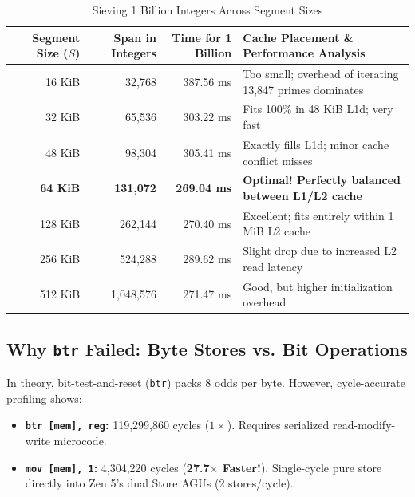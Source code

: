 \documentclass[11pt,a4paper]{article}
\begin{document}
\begin{table}[htbp]
\centering
\scriptsize
\caption{Sieving 1 Billion Integers Across Segment Sizes}
\label{tab:cache_bench}
\begin{tabular}{r r r l}
\toprule
\textbf{Segment Size ($S$)} & \textbf{Span in Integers} & \textbf{Time for 1 Billion} & \textbf{Cache Placement \& Performance Analysis} \\
\midrule
16 KiB & 32,768 & 387.56 ms & Too small; overhead of iterating 13,847 primes dominates \\
32 KiB & 65,536 & 303.22 ms & Fits 100\% in 48 KiB L1d; very fast \\
48 KiB & 98,304 & 305.41 ms & Exactly fills L1d; minor cache conflict misses \\
\textbf{64 KiB} & \textbf{131,072} & \textbf{269.04 ms} & \textbf{Optimal! Perfectly balanced between L1/L2 cache} \\
128 KiB & 262,144 & 270.40 ms & Excellent; fits entirely within 1 MiB L2 cache \\
256 KiB & 524,288 & 289.62 ms & Slight drop due to increased L2 read latency \\
512 KiB & 1,048,576 & 271.47 ms & Good, but higher initialization overhead \\
\bottomrule
\end{tabular}
\end{table}

\subsection{Why \texttt{btr} Failed: Byte Stores vs. Bit Operations}
In theory, bit-test-and-reset (\texttt{btr}) packs 8 odds per byte. However, cycle-accurate profiling shows:
\begin{itemize}\setlength{\itemsep}{0pt}
    \item \textbf{\texttt{btr [mem], reg}:} 119,299,860 cycles ($1\times$). Requires serialized read-modify-write microcode.
    \item \textbf{\texttt{mov [mem], 1}:} 4,304,220 cycles (\textbf{27.7$\times$ Faster!}). Single-cycle pure store directly into Zen 5's dual Store AGUs (2 stores/cycle).
\end{itemize}

\newpage

\end{document}
